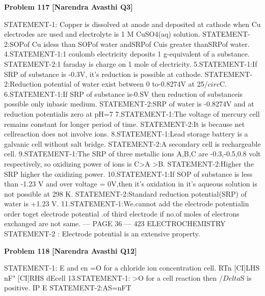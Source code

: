 \begin{problembox}
\textbf{Problem 117} \hfill \textbf{[Narendra Avasthi Q3]}
\label{q:ext-narendra_avasthi_all_questions-117}

STATEMENT-1: Copper is dissolved at anode and deposited at cathode when Cu
electrodes are used and electrolyte is 1 M CuSO4(aq) solution.
STATEMENT-2:SOPof Cu isless than SOPof water andSRPof Cuis greater thanSRPof
water.
4.STATEMENT-1:1 coulomb electricity deposits 1 g-equivalent of a substance.
STATEMENT-2:1 faraday is charge on 1 mole of electricity.
5.STATEMENT-1:If SRP of substance is -0.3V, it's reduction is possible at cathode.
STATEMENT-2:Reduction potential of water exist between 0 to-0.8274V at 25$/circ$C.
6.STATEMENT-1:If SRP of substance is-0.SV then reduction of substanceis possible only
inbasic medium.
STATEMENT-2:SRP of water is -0.8274V and at reduction potentialis zero at pH=7
7.STATEMENT-1:The voltage of mercury cell remains constant for longer period of time.
STATEMENT-2:It is because net cellreaction does not involve ions.
8.STATEMENT-1:Lead storage battery is a galvanic cell without salt bridge.
STATEMENT-2:A secondary cell is rechargeable cell.
9.STATEMENT-1:The SRP of three metallic ions A,B,C are -0.3,-0.5,0.8 volt
respectively, so oxidizing power of ions is C>A >B.
STATEMENT-2:Higher the SRP higher the oxidizing power.
10.STATEMENT-1:If SOP of substance is less than -1.23 V and over voltage = 0V,then it's
oxidation in it's aqueous solution is not possible at 298 K.
STATEMENT-2:Standard reduction potential(SRP) of water is +1.23 V.
11.STATEMENT-1:We.cannot add the electrode potentialin order toget electrode potential
.of third electrode if no.of moles of electrons exchanged are not same.
--- PAGE 36 ---
423
ELECTROCHEMISTRY
STATEMENT-2 : Electrode potential is an extensive property.
\end{problembox}

\begin{problembox}
\textbf{Problem 118} \hfill \textbf{[Narendra Avasthi Q12]}
\label{q:ext-narendra_avasthi_all_questions-118}

STATEMENT-1: E and en =O for a chloride ion concentration cell.
RTn
[CI]LHS
nF"
[CI]RHS
dEcell
13.STATEMENT-1:
>O for a cell reaction then $/Delta$S is positive.
IP
E
STATEMENT-2:AS=nFT
\end{problembox}

